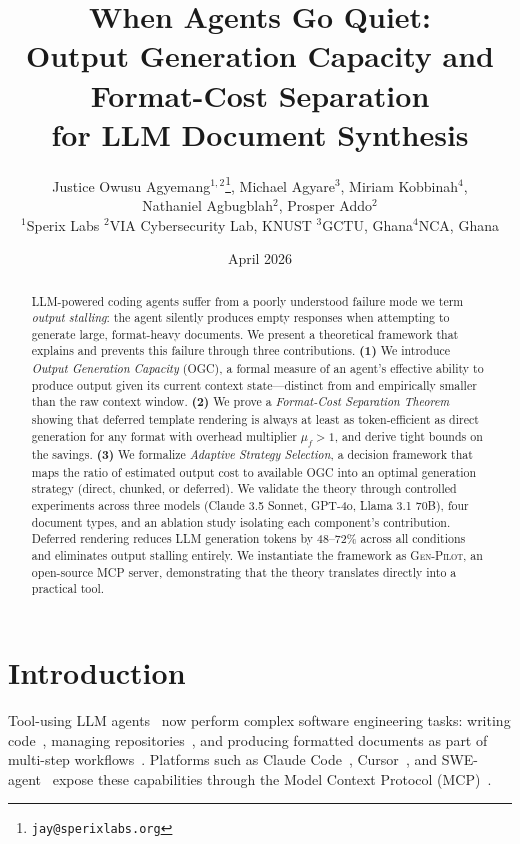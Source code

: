 \documentclass[11pt,twocolumn]{article}
\title{When Agents Go Quiet:\\
Output Generation Capacity and Format-Cost Separation\\
for LLM Document Synthesis}
\author{%
Justice Owusu Agyemang$^{1,2}$\thanks{\texttt{jay@sperixlabs.org}},\quad
Michael Agyare$^{3}$,\quad
Miriam Kobbinah$^{4}$,\\
Nathaniel Agbugblah$^{2}$,\quad
Prosper Addo$^{2}$\\[4pt]
{\small $^1$Sperix Labs \qquad $^2$VIA Cybersecurity Lab, KNUST \qquad $^3$GCTU, Ghana\qquad $^4$NCA, Ghana}%
}
\date{April 2026}
\newcommand{\genpilot}{\textsc{Gen-Pilot}}
\begin{document}
\maketitle

\begin{abstract}
LLM-powered coding agents suffer from a poorly understood failure mode
we term \emph{output stalling}: the agent silently produces empty
responses when attempting to generate large, format-heavy documents.
We present a theoretical framework that explains and prevents this
failure through three contributions.
\textbf{(1)} We introduce \emph{Output Generation Capacity} (OGC),
a formal measure of an agent's effective ability to produce output
given its current context state---distinct from and empirically
smaller than the raw context window.
\textbf{(2)} We prove a \emph{Format-Cost Separation Theorem}
showing that deferred template rendering is always at least as
token-efficient as direct generation for any format with overhead
multiplier $\mu_f > 1$, and derive tight bounds on the savings.
\textbf{(3)} We formalize \emph{Adaptive Strategy Selection},
a decision framework that maps the ratio of estimated output cost
to available OGC into an optimal generation strategy (direct,
chunked, or deferred).
We validate the theory through controlled experiments across three
models (Claude 3.5 Sonnet, GPT-4o, Llama 3.1 70B), four document
types, and an ablation study isolating each component's contribution.
Deferred rendering reduces LLM generation tokens by 48--72\%
across all conditions and eliminates output stalling entirely.
We instantiate the framework as \genpilot{}, an open-source MCP
server, demonstrating that the theory translates directly into
a practical tool.
\end{abstract}

\section{Introduction}
\label{sec:intro}

Tool-using LLM agents~\cite{schick2023toolformer,yao2023react,karpas2022mrkl}
now perform complex software engineering tasks: writing code~\cite{chen2021codex},
managing repositories~\cite{yang2024sweagent}, and producing formatted
documents as part of multi-step workflows~\cite{wang2024survey,xi2023rise}.
Platforms such as Claude Code~\cite{claudecode2025}, Cursor~\cite{cursor2024},
and SWE-agent~\cite{yang2024sweagent} expose these capabilities through
the Model Context Protocol (MCP)~\cite{mcp2024}.
\end{document}
